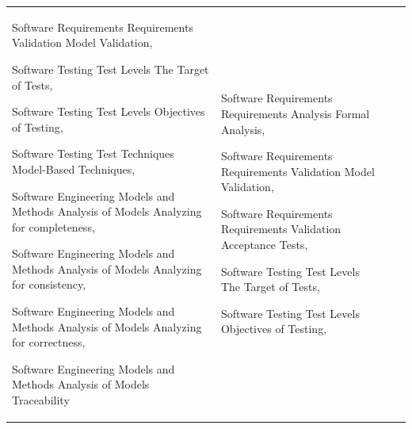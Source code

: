 \begin{longtable}[l]{|>{\centering}p{2cm}|>{\centering}p{2.5cm}|>{\centering}p{5cm}|>{\centering}p{5cm}|}
Software Requirements \textrightarrow{} Requirements Validation \textrightarrow{}
Model Validation,

Software Testing \textrightarrow{} Test Levels \textrightarrow{} The
Target of Tests,

Software Testing \textrightarrow{} Test Levels \textrightarrow{} Objectives
of Testing,

Software Testing \textrightarrow{} Test Techniques \textrightarrow{}
Model-Based Techniques,

Software Engineering \textrightarrow{} Models and Methods \textrightarrow{}
Analysis of Models \textrightarrow{} Analyzing for completeness,

Software Engineering \textrightarrow{} Models and Methods \textrightarrow{}
Analysis of Models \textrightarrow{} Analyzing for consistency,

Software Engineering \textrightarrow{} Models and Methods \textrightarrow{}
Analysis of Models \textrightarrow{} Analyzing for correctness,

Software Engineering \textrightarrow{} Models and Methods \textrightarrow{}
Analysis of Models \textrightarrow{} Traceability  & Software Requirements \textrightarrow{} Requirements Analysis \textrightarrow{}
Formal Analysis,

Software Requirements \textrightarrow{} Requirements Validation \textrightarrow{}
Model Validation,

Software Requirements \textrightarrow{} Requirements Validation \textrightarrow{}
Acceptance Tests,

Software Testing \textrightarrow{} Test Levels \textrightarrow{} The
Target of Tests,

Software Testing \textrightarrow{} Test Levels \textrightarrow{} Objectives
of Testing,


\end{longtable}
